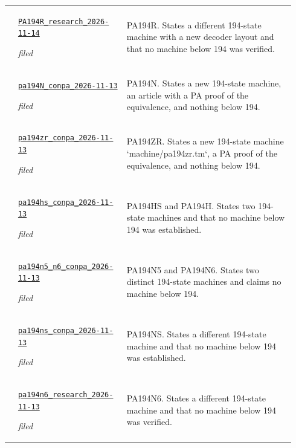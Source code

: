 {\begin{longtable}{@{}>{\raggedright\arraybackslash}p{0.035\linewidth}>{\raggedright\arraybackslash}p{0.345\linewidth}>{\raggedright\arraybackslash}p{0.56\linewidth}@{}}
45 & \href{https://github.com/VladimirReshetnikov/ProveIt/blob/1c9524d8bf2e0a27b9a16ff622359927f536e663/Computability/BusyBeaver/Research/PA/docs/PA194R_research_2026-11-14/README.md}{\nolinkurl{PA194R_research_2026-11-14}}\par\emph{filed} & PA194R. States a different 194-state machine with a new decoder layout and that no machine below 194 was verified.\\[4pt]
46 & \href{https://github.com/VladimirReshetnikov/ProveIt/blob/1c9524d8bf2e0a27b9a16ff622359927f536e663/Computability/BusyBeaver/Research/PA/docs/pa194N_conpa_2026-11-13/README.md}{\nolinkurl{pa194N_conpa_2026-11-13}}\par\emph{filed} & PA194N. States a new 194-state machine, an article with a PA proof of the equivalence, and nothing below 194.\\[4pt]
47 & \href{https://github.com/VladimirReshetnikov/ProveIt/blob/1c9524d8bf2e0a27b9a16ff622359927f536e663/Computability/BusyBeaver/Research/PA/docs/pa194zr_conpa_2026-11-13/README.md}{\nolinkurl{pa194zr_conpa_2026-11-13}}\par\emph{filed} & PA194ZR. States a new 194-state machine `machine/pa194zr.tm`, a PA proof of the equivalence, and nothing below 194.\\[4pt]
48 & \href{https://github.com/VladimirReshetnikov/ProveIt/blob/1c9524d8bf2e0a27b9a16ff622359927f536e663/Computability/BusyBeaver/Research/PA/docs/pa194hs_conpa_2026-11-13/README.md}{\nolinkurl{pa194hs_conpa_2026-11-13}}\par\emph{filed} & PA194HS and PA194H. States two 194-state machines and that no machine below 194 was established.\\[4pt]
49 & \href{https://github.com/VladimirReshetnikov/ProveIt/blob/1c9524d8bf2e0a27b9a16ff622359927f536e663/Computability/BusyBeaver/Research/PA/docs/pa194n5_n6_conpa_2026-11-13/README.txt}{\nolinkurl{pa194n5_n6_conpa_2026-11-13}}\par\emph{filed} & PA194N5 and PA194N6. States two distinct 194-state machines and claims no machine below 194.\\[4pt]
50 & \href{https://github.com/VladimirReshetnikov/ProveIt/blob/1c9524d8bf2e0a27b9a16ff622359927f536e663/Computability/BusyBeaver/Research/PA/docs/pa194ns_conpa_2026-11-13/README.md}{\nolinkurl{pa194ns_conpa_2026-11-13}}\par\emph{filed} & PA194NS. States a different 194-state machine and that no machine below 194 was established.\\[4pt]
51 & \href{https://github.com/VladimirReshetnikov/ProveIt/blob/1c9524d8bf2e0a27b9a16ff622359927f536e663/Computability/BusyBeaver/Research/PA/docs/pa194n6_research_2026-11-13/README.md}{\nolinkurl{pa194n6_research_2026-11-13}}\par\emph{filed} & PA194N6. States a different 194-state machine and that no machine below 194 was verified.\\[4pt]

\end{longtable}}
